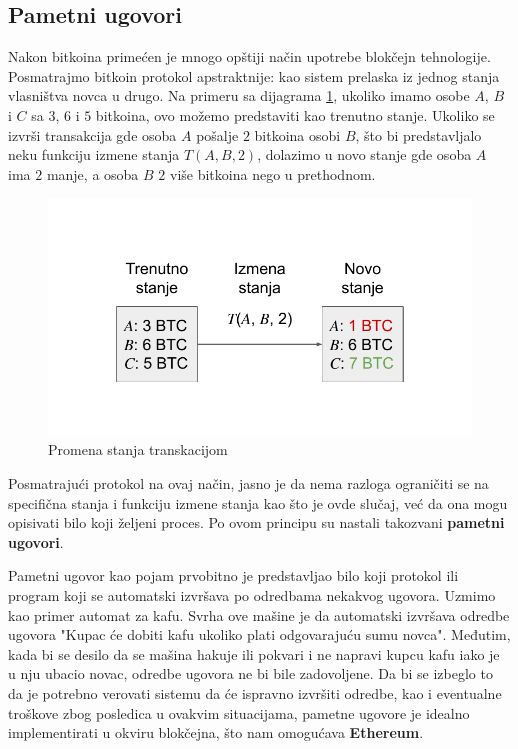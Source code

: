 \documentclass[a4paper]{article}
\begin{document}
{\subsection{Pametni ugovori}
Nakon bitkoina primećen je mnogo opštiji način upotrebe blokčejn tehnologije.
Posmatrajmo bitkoin protokol apstraktnije: kao sistem prelaska iz jednog stanja vlasništva novca u drugo.
Na primeru sa dijagrama \ref{fig:state_diagram}, ukoliko imamo osobe $A$, $B$ i $C$ sa $3$, $6$ i $5$ bitkoina, ovo možemo predstaviti kao trenutno stanje.
Ukoliko se izvrši transakcija gde osoba $A$ pošalje $2$ bitkoina osobi $B$, što bi predstavljalo neku funkciju izmene stanja $T(A, B, 2)$, dolazimo u novo stanje gde osoba $A$ ima $2$ manje, a osoba $B$ $2$ više bitkoina nego u prethodnom.

\begin{figure}[H]
    \centering
        \includegraphics[scale=0.6]{State_Transition.pdf}
    \caption{Promena stanja transkacijom}
    \label{fig:state_diagram}
\end{figure}


Posmatrajući protokol na ovaj način, jasno je da nema razloga ograničiti se na specifična stanja i funkciju izmene stanja kao što je ovde slučaj, već da ona mogu opisivati bilo koji željeni proces.
Po ovom principu su nastali takozvani \textbf{pametni ugovori}.

Pametni ugovor kao pojam prvobitno je predstavljao bilo koji protokol ili program koji se automatski izvršava po odredbama nekakvog ugovora.
Uzmimo kao primer automat za kafu.
Svrha ove mašine je da automatski izvršava odredbe ugovora "Kupac će dobiti kafu ukoliko plati odgovarajuću sumu novca". Međutim, kada bi se desilo da se mašina hakuje ili pokvari i ne napravi kupcu kafu iako je u nju ubacio novac, odredbe ugovora ne bi bile zadovoljene.
Da bi se izbeglo to da je potrebno verovati sistemu da će ispravno izvršiti odredbe, kao i eventualne troškove zbog posledica u ovakvim situacijama, pametne ugovore je idealno implementirati u okviru blokčejna, što nam omogućava \textbf{Ethereum}.

}
\end{document}
